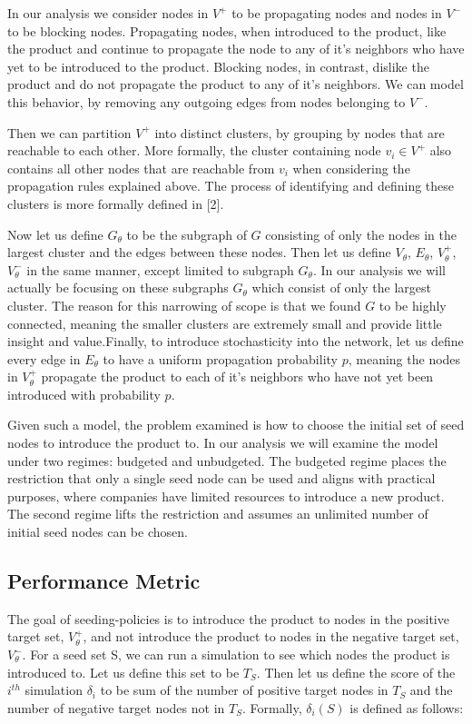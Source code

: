 In our analysis we consider nodes in $V^+$ to be propagating nodes and nodes in $V^-$ to be blocking nodes. Propagating nodes, when introduced to the product, like the product and continue to propagate the node to any of it's neighbors who have yet to be introduced to the product. Blocking nodes, in contrast, dislike the product and do not propagate the product to any of it's neighbors. We can model this behavior, by removing any outgoing edges from nodes belonging to $V^-$. 

Then we can partition $V^+$ into distinct clusters, by grouping by nodes that are reachable to each other. More formally, the cluster containing node $v_i \in V^+$ also contains all other nodes that are reachable from $v_i$ when considering the propagation rules explained above. The process of identifying and defining these clusters is more formally defined in [2]. 

Now let us define $G_\theta$ to be the subgraph of $G$ consisting of only the nodes in the largest cluster and the edges between these nodes. Then let us define $V_\theta$, $E_\theta$, $V_\theta^+$, $V_\theta^-$ in the same manner, except limited to subgraph $G_\theta$. In our analysis we will actually be focusing on these subgraphs $G_\theta$ which consist of only the largest cluster. The reason for this narrowing of scope is that we found $G$ to be highly connected, meaning the smaller clusters are extremely small and provide little insight and value.Finally, to introduce stochasticity into the network, let us define every edge in $E_\theta$ to have a uniform propagation probability $p$, meaning the nodes in $V_\theta^+$ propagate the product to each of it's neighbors who have not yet been introduced with probability $p$.

Given such a model, the problem examined is how to choose the initial set of seed nodes to introduce the product to. In our analysis we will examine the model under two regimes: budgeted and unbudgeted. The budgeted regime places the restriction that only a single seed node can be used and aligns with practical purposes, where companies have limited resources to introduce a new product. The second regime lifts the restriction and assumes an unlimited number of initial seed nodes can be chosen.

\subsection{Performance Metric}

The goal of seeding-policies is to introduce the product to nodes in the positive target set, $V_\theta^+$, and not introduce the product to nodes in the negative target set, $V_\theta^-$. For a seed set S, we can run a simulation to see which nodes the product is introduced to. Let us define this set to be $T_S$. Then let us define the score of the $i^{th}$ simulation $\delta_i$ to be sum of the number of  positive target nodes in $T_S$ and the number of negative target nodes not in $T_S$. Formally, $\delta_i(S)$ is defined as follows:

